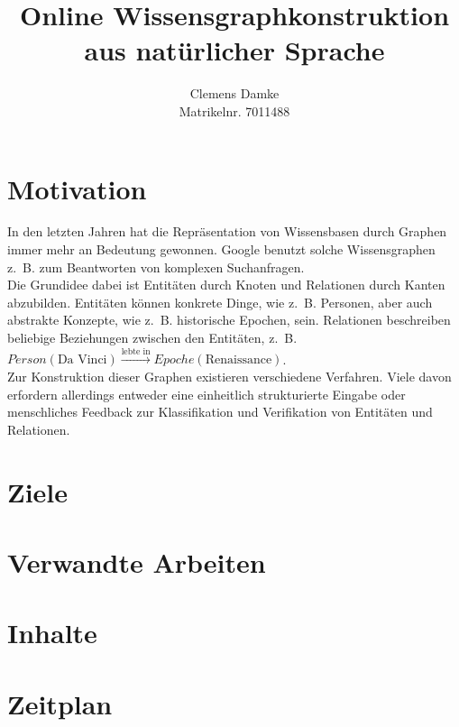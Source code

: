 \documentclass[11pt, a4paper]{scrreprt}
\begin{document}
\frontmatter
\subject{Bachelorarbeit Proposal}
\title{Online Wissensgraphkonstruktion aus natürlicher Sprache}
\author{Clemens Damke\\[1ex]
Matrikelnr. 7011488}
\publishers{
{\normalsize betreut von}\\[2ex]
Prof.\ Dr.\ Eyke Hüllermeier\\
Intelligente Systeme\\
Institut für Informatik\\
Universität Paderborn
}
\maketitle

\section{Motivation}

In den letzten Jahren hat die Repräsentation von Wissensbasen durch Graphen immer mehr an Bedeutung gewonnen.
Google benutzt solche Wissensgraphen z.~B. zum Beantworten von komplexen Suchanfragen.\\

Die Grundidee dabei ist Entitäten durch Knoten und Relationen durch Kanten abzubilden.
Entitäten können konkrete Dinge, wie z.~B. Personen, aber auch abstrakte Konzepte, wie z.~B. historische Epochen, sein.
Relationen beschreiben beliebige Beziehungen zwischen den Entitäten, z.~B. $Person(\text{Da Vinci}) \xrightarrow{\text{lebte in}} Epoche(\text{Renaissance})$.\\

Zur Konstruktion dieser Graphen existieren verschiedene Verfahren.
Viele davon erfordern allerdings entweder eine einheitlich strukturierte Eingabe oder menschliches Feedback zur Klassifikation und Verifikation von Entitäten und Relationen.

\section{Ziele}

\section{Verwandte Arbeiten}

\section{Inhalte}

\section{Zeitplan}
\end{document}
